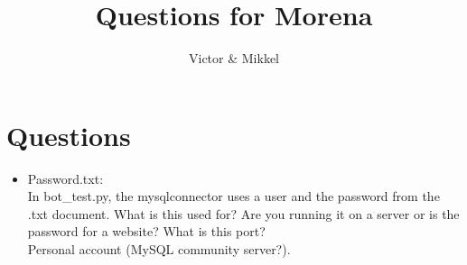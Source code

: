 \documentclass{article}
\begin{document}
\title{Questions for Morena}
\author{Victor \& Mikkel}

\maketitle

\section{Questions}
\begin{itemize}
	\item Password.txt: \\
    In bot\_test.py, the mysqlconnector uses a user and the password from the .txt document.
    What is this used for?
    Are you running it on a server or is the password for a website?
    What is this port? \\
    Personal account (MySQL community server?).
\end{itemize}
\end{document}
